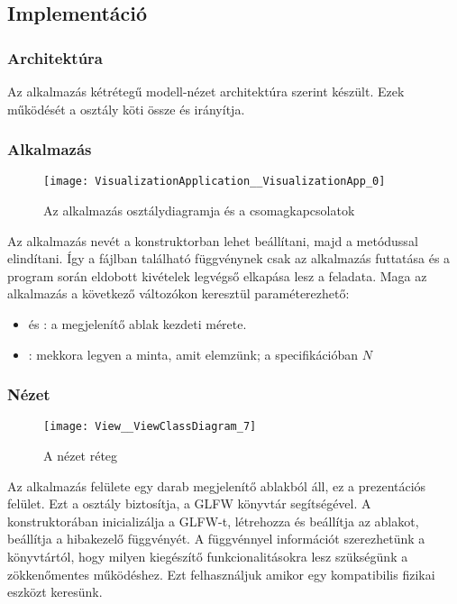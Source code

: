 
\subsection{Implement\'aci\'o}

\subsubsection{Architekt\'ura}
Az alkalmaz\'as k\'etr\'eteg\H u modell-n\'ezet architekt\'ura szerint k\'esz\"ult.
Ezek m\H uk\"od\'es\'et a  oszt\'aly k\"oti \"ossze \'es ir\'any\'itja.

\subsubsection{Alkalmaz\'as}
\begin{figure}[h]
	\texttt{[image: VisualizationApplication\_\_VisualizationApp\_0]}
	\centering
	\caption{Az alkalmaz\'as oszt\'alydiagramja \'es a csomagkapcsolatok}
\end{figure}

Az alkalmaz\'as nev\'et a konstruktorban lehet be\'all\'itani, majd a  met\'odussal elind\'itani. \'Igy a  f\'ajlban tal\'alhat\'o  f\"uggv\'enynek csak az alkalmaz\'as futtat\'asa \'es a program sor\'an eldobott kiv\'etelek legv\'egs\H o elkap\'asa lesz a feladata.
Maga az alkalmaz\'as a k\"ovetkez\H o v\'altoz\'okon kereszt\"ul param\'eterezhet\H o:
\begin{itemize}
	\item {} \'es : a megjelen\'it\H o ablak kezdeti m\'erete.
	\item {}: mekkora legyen a minta, amit elemz\"unk; a specifik\'aci\'oban $N$
\end{itemize}

\subsubsection{N\'ezet}
\begin{figure}[h]
	\texttt{[image: View\_\_ViewClassDiagram\_7]}
	\centering
	\caption{A n\'ezet r\'eteg}
\end{figure}
Az alkalmaz\'as fel\"ulete egy darab megjelen\'it\H o ablakb\'ol \'all, ez a prezent\'aci\'os fel\"ulet.
Ezt a  oszt\'aly biztos\'itja, a GLFW k\"onyvt\'ar seg\'its\'eg\'evel. \newline
A konstruktor\'aban inicializ\'alja a GLFW-t, l\'etrehozza \'es be\'all\'itja az ablakot, be\'all\'itja a hibakezel\H o f\"uggv\'eny\'et. \newline
A  f\"uggv\'ennyel inform\'aci\'ot szerezhet\"unk a k\"onyvt\'art\'ol, hogy milyen kieg\'esz\'it\H o funkcionalit\'asokra lesz sz\"uks\'eg\"unk a z\"okken\H omentes m\H uk\"od\'eshez. Ezt felhaszn\'aljuk amikor egy kompatibilis fizikai eszk\"ozt keres\"unk.

